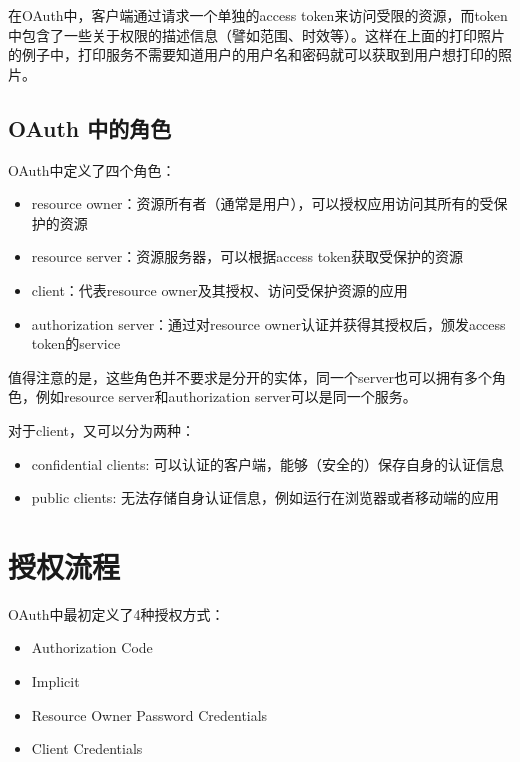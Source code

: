 \documentclass[12pt]{article}
\begin{document}
在OAuth中，客户端通过请求一个单独的access token来访问受限的资源，而token中包含了一些关于权限的描述信息（譬如范围、时效等）。这样在上面的打印照片的例子中，打印服务不需要知道用户的用户名和密码就可以获取到用户想打印的照片。

\subsection{OAuth 中的角色}\label{oauth-ux4e2dux7684ux89d2ux8272}

OAuth中定义了四个角色：

\begin{itemize}
\tightlist
\item
  resource owner：资源所有者（通常是用户），可以授权应用访问其所有的受保护的资源
\item
  resource server：资源服务器，可以根据access token获取受保护的资源
\item
  client：代表resource owner及其授权、访问受保护资源的应用
\item
  authorization server：通过对resource owner认证并获得其授权后，颁发access token的service
\end{itemize}

值得注意的是，这些角色并不要求是分开的实体，同一个server也可以拥有多个角色，例如resource server和authorization server可以是同一个服务。

对于client，又可以分为两种：

\begin{itemize}
\tightlist
\item
  confidential clients: 可以认证的客户端，能够（安全的）保存自身的认证信息
\item
  public clients: 无法存储自身认证信息，例如运行在浏览器或者移动端的应用
\end{itemize}

\section{授权流程}\label{ux6388ux6743ux6d41ux7a0b}

OAuth中最初定义了4种授权方式：

\begin{itemize}
\tightlist
\item
  Authorization Code
\item
  Implicit
\item
  Resource Owner Password Credentials
\item
  Client Credentials
\end{itemize}
\end{document}
